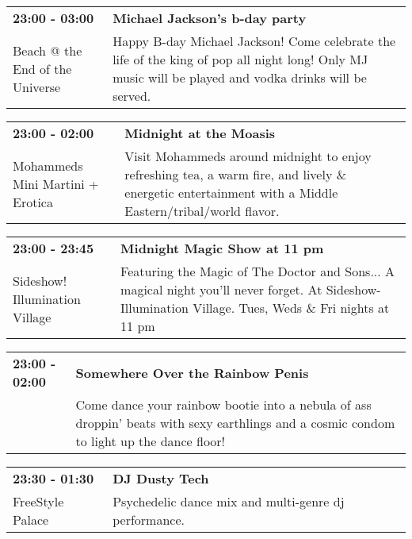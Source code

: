 \begin{tabular}{ p{1in} p{2.2in} }
    \textbf{23:00 - 03:00} & \textbf{Michael Jackson's b-day party} \\
    Beach @ the End of the Universe \newline  & Happy B-day Michael Jackson! Come celebrate the life of the king of pop all night long! Only MJ music will be played and vodka drinks will be served. \\
    \hline 
\end{tabular}
    
\begin{tabular}{ p{1in} p{2.2in} }
    \textbf{23:00 - 02:00} & \textbf{Midnight at the Moasis} \\
    Mohammeds Mini Martini + Erotica \newline  & Visit Mohammeds around midnight to enjoy refreshing tea, a warm fire, and lively \& energetic entertainment with a Middle Eastern/tribal/world flavor. \\
    \hline 
\end{tabular}
    
\begin{tabular}{ p{1in} p{2.2in} }
    \textbf{23:00 - 23:45} & \textbf{Midnight Magic Show at 11 pm} \\
    Sideshow! \newline Illumination Village & Featuring the Magic of The Doctor and Sons... A magical night you'll never forget. At Sideshow- Illumination Village. Tues, Weds \& Fri nights at 11 pm \\
    \hline 
\end{tabular}
    
\begin{tabular}{ p{1in} p{2.2in} }
    \textbf{23:00 - 02:00} & \textbf{Somewhere Over the Rainbow Penis} \\
    ~ \newline  & Come dance your rainbow bootie into a nebula of ass droppin' beats with sexy earthlings and a cosmic condom to light up the dance floor! \\
    \hline 
\end{tabular}
    
\begin{tabular}{ p{1in} p{2.2in} }
    \textbf{23:30 - 01:30} & \textbf{DJ Dusty Tech} \\
    FreeStyle Palace \newline  & Psychedelic dance mix and multi-genre dj performance. \\
    \hline 
\end{tabular}
    
